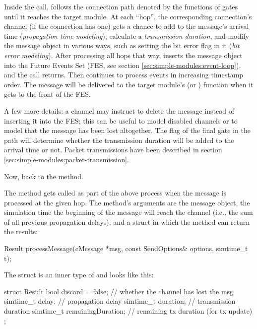Inside the  call, {\opp} follows the
connection path denoted by the  functions of gates
until it reaches the target module. At each ``hop'', the corresponding
connection's channel (if the connection has one) gets a chance to add to
the message's arrival time (\textit{propagation time modeling}), calculate a
\textit{transmission duration}, and modify the message object in various
ways, such as setting the bit error flag in it (\textit{bit error modeling}).
After processing all hops that way, {\opp} inserts the message object
into the Future Events Set (FES, see section
\ref{sec:simple-modules:event-loop}), and the  call returns.
Then {\opp} continues to process events in increasing timestamp order.
The message will be delivered to the target module's 
(or ) function when it gets to the front of the FES.

A few more details: a channel may instruct {\opp} to delete the message
instead of inserting it into the FES; this can be useful to model
disabled channels or to model that the message has been lost altogether.
The  flag of the final gate in the path
will determine whether the transmission duration will be added to the
arrival time or not. Packet transmissions have been described in section
\ref{sec:simple-modules:packet-transmission}.

Now, back to the  method.

The method gets called as part of the above process when the message
is processed at the given hop. The method's arguments are the message
object, the simulation time the beginning of the message will reach
the channel (i.e., the sum of all previous propagation delays),
and a struct in which the method can return the results:

\begin{cpp}
Result processMessage(cMessage *msg, const SendOptions& options, simtime_t t);
\end{cpp}

The  struct is an inner type of 
and looks like this:

\begin{cpp}
struct Result
{
    bool discard = false;        // whether the channel has lost the msg
    simtime_t delay;             // propagation delay
    simtime_t duration;          // transmission duration
    simtime_t remainingDuration; // remaining tx duration (for tx update)
};
\end{cpp}

